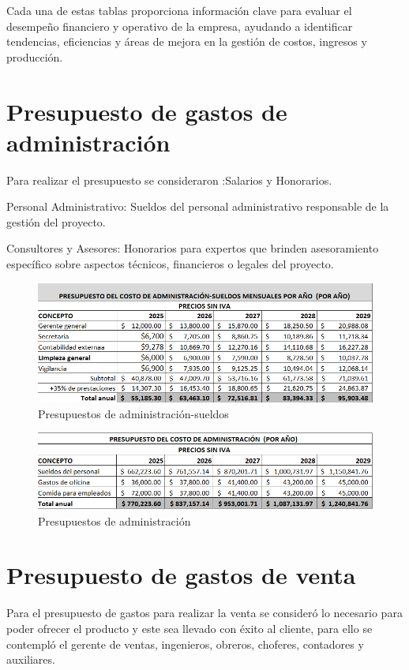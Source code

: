 Cada una de estas tablas proporciona información clave para evaluar el desempeño financiero y operativo de la empresa, ayudando a identificar tendencias, eficiencias y áreas de mejora en la gestión de costos, ingresos y producción.

\section{Presupuesto de gastos de administración}


Para realizar el presupuesto se consideraron :Salarios y Honorarios.

Personal Administrativo: Sueldos del personal administrativo responsable de la gestión del proyecto.

Consultores y Asesores: Honorarios para expertos que brinden asesoramiento específico sobre aspectos técnicos, financieros o legales del proyecto.

\begin{figure}[H]
    \centering	
    \includegraphics[width=.7\textwidth]{chapters/ELC_4.png} 
    \caption{Presupuestos de administración-sueldos}
\label{fig:macrolocalizacion}
\end{figure}

\begin{figure}[H]
    \centering	
    \includegraphics[width=.7\textwidth]{chapters/ELC_5.png} 
    \caption{Presupuestos de administración}
\label{fig:macrolocalizacion}
\end{figure}



\section{Presupuesto de gastos de venta}

Para el presupuesto de gastos para realizar la venta se consideró lo necesario para poder ofrecer el producto y este sea llevado con éxito al cliente, para ello se contempló el gerente de ventas, ingenieros, obreros, choferes, contadores y auxiliares.

